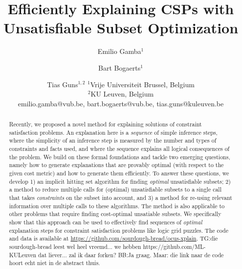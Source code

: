 \documentclass{article}
\title{Efficiently Explaining CSPs with Unsatisfiable Subset Optimization}
\author{
	Emilio Gamba$^1$
	\and
	Bart Bogaerts$^1$\and
	Tias Guns$^{1,2}$
	\affiliations
	$^1$Vrije Universiteit Brussel, Belgium\\
	$^2$KU Leuven, Belgium\\
	\emails
	emilio.gamba@vub.be, bart.bogaerts@vub.be,
	tias.guns@kuleuven.be
}
\newcommand\comment[1]{\marginpar{\parbox{\marginparwidth}{\tiny #1}}}
\renewcommand\comment[1]{#1}
\newcommand{\tias}[1]{{\comment{\color{blue}\textsc{TG:}#1}}}
\newcommand{\emilio}[1]{{\comment{#1}}}
\newcommand{\bart}[1]{{\comment{\color{OliveGreen}\textsc{BB:}#1}}}
\newcommand\maxsat{MaxSAT\xspace}
\begin{document}
 
\maketitle

\begin{abstract}
Recently, we proposed a novel method for explaining solutions of constraint satisfaction problems. 
An explanation here is a \textit{sequence} of simple inference steps, where the simplicity of an inference step is measured by the number and types of constraints and facts used, and where the sequence explains all logical consequences of the problem. 
We %
build on these formal foundations and tackle two emerging questions, namely how to generate explanations that are provably optimal (with respect to the given cost metric) and how to generate them efficiently. 
To answer these questions, we develop 1) an implicit hitting set algorithm for finding \textit{optimal} unsatisfiable subsets; 2) a method to reduce multiple calls for (optimal) unsatisfiable subsets to a single call that takes \emph{constraints} on the subset into account, and 3) a method for re-using relevant information over multiple calls to these algorithms. 
The method is also applicable to other problems that require finding cost-optimal unsatiable subsets.
We specifically show that this approach can be used to effectively find sequences of \textit{optimal} explanation steps for constraint satisfaction problems like logic grid puzzles. \emilio{The code and data is available at \url{https://github.com/sourdough-bread/ocus-xplain}.} \tias{die sourdough-bread leest wel heel vreemd... we hebben https://github.com/ML-KULeuven dat liever... zal ik daar forken?} \bart{Ja graag. Maar: die link naar de code hoort echt niet in de abstract thuis.}
\end{abstract}
\end{document}
